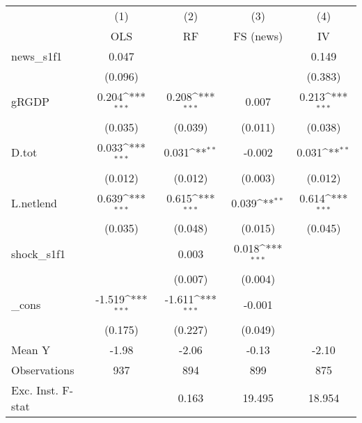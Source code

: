 {
\def\sym#1{\ifmmode^{#1}\else\(^{#1}\)\fi}
\begin{tabular}{l*{4}{c}}
\toprule
            &\multicolumn{1}{c}{(1)}&\multicolumn{1}{c}{(2)}&\multicolumn{1}{c}{(3)}&\multicolumn{1}{c}{(4)}\\
            &\multicolumn{1}{c}{OLS}&\multicolumn{1}{c}{RF}&\multicolumn{1}{c}{FS (news)}&\multicolumn{1}{c}{IV}\\
\midrule
news\_s1f1   &       0.047         &                     &                     &       0.149         \\
            &     (0.096)         &                     &                     &     (0.383)         \\
\addlinespace
gRGDP       &       0.204\sym{***}&       0.208\sym{***}&       0.007         &       0.213\sym{***}\\
            &     (0.035)         &     (0.039)         &     (0.011)         &     (0.038)         \\
\addlinespace
D.tot       &       0.033\sym{***}&       0.031\sym{**} &      -0.002         &       0.031\sym{**} \\
            &     (0.012)         &     (0.012)         &     (0.003)         &     (0.012)         \\
\addlinespace
L.netlend   &       0.639\sym{***}&       0.615\sym{***}&       0.039\sym{**} &       0.614\sym{***}\\
            &     (0.035)         &     (0.048)         &     (0.015)         &     (0.045)         \\
\addlinespace
shock\_s1f1  &                     &       0.003         &       0.018\sym{***}&                     \\
            &                     &     (0.007)         &     (0.004)         &                     \\
\addlinespace
\_cons      &      -1.519\sym{***}&      -1.611\sym{***}&      -0.001         &                     \\
            &     (0.175)         &     (0.227)         &     (0.049)         &                     \\
\midrule
Mean Y      &       -1.98         &       -2.06         &       -0.13         &       -2.10         \\
Observations&         937         &         894         &         899         &         875         \\
Exc. Inst. F-stat&                     &       0.163         &      19.495         &      18.954         \\
\bottomrule
\end{tabular}
}

